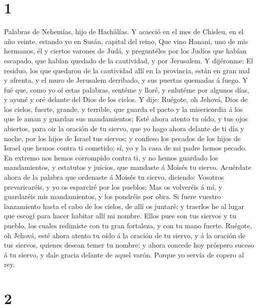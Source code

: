 \hypertarget{section}{%
\section{1}\label{section}}

 Palabras de Nehemías, hijo de Hachâlías. Y acaeció en el
mes de Chisleu, en el año veinte, estando yo en Susán, capital del
reino,  Que vino Hanani, uno de mis hermanos, él y ciertos
varones de Judá, y preguntéles por los Judíos que habían escapado, que
habían quedado de la cautividad, y por Jerusalem.  Y
dijéronme: El residuo, los que quedaron de la cautividad allí en la
provincia, están en gran mal y afrenta, y el muro de Jerusalem
derribado, y sus puertas quemadas á fuego.  Y fué que,
como yo oí estas palabras, sentéme y lloré, y enlutéme por algunos días,
y ayuné y oré delante del Dios de los cielos.  Y dije:
Ruégote, oh Jehová, Dios de los cielos, fuerte, grande, y terrible, que
guarda el pacto y la misericordia á los que le aman y guardan sus
mandamientos;  Esté ahora atento tu oído, y tus ojos
abiertos, para oir la oración de tu siervo, que yo hago ahora delante de
ti día y noche, por los hijos de Israel tus siervos; y confieso los
pecados de los hijos de Israel que hemos contra ti cometido; sí, yo y la
casa de mi padre hemos pecado.  En extremo nos hemos
corrompido contra ti, y no hemos guardado los mandamientos, y estatutos
y juicios, que mandaste á Moisés tu siervo.  Acuérdate
ahora de la palabra que ordenaste á Moisés tu siervo, diciendo: Vosotros
prevaricaréis, y yo os esparciré por los pueblos:  Mas os
volveréis á mí, y guardaréis mis mandamientos, y los pondréis por obra.
Si fuere vuestro lanzamiento hasta el cabo de los cielos, de allí os
juntaré; y traerlos he al lugar que escogí para hacer habitar allí mi
nombre.  Ellos pues son tus siervos y tu pueblo, los
cuales redimiste con tu gran fortaleza, y con tu mano fuerte.
 Ruégote, oh Jehová, esté ahora atento tu oído á la
oración de tu siervo, y á la oración de tus siervos, quienes desean
temer tu nombre: y ahora concede hoy próspero suceso á tu siervo, y dale
gracia delante de aquel varón. Porque yo servía de copero al rey.

\hypertarget{section-1}{%
\section{2}\label{section-1}}

